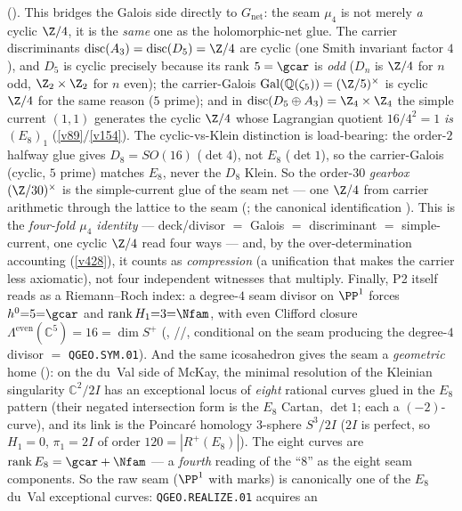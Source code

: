 \begin{keybox}
{().} This bridges the Galois side directly to $G_{\mathrm{net}}$: the seam
$\mu_4$ is not merely \emph{a} cyclic $\Z/4$, it is the \emph{same} one as the holomorphic-net glue. The
carrier discriminants $\operatorname{disc}(A_3)=\operatorname{disc}(D_5)=\Z/4$ are cyclic (one Smith
invariant factor $4$), and $D_5$ is cyclic precisely because its rank $5=\gcar$ is \emph{odd} ($D_n$ is
$\Z/4$ for $n$ odd, $\Z_2\times\Z_2$ for $n$ even); the carrier-Galois
$\operatorname{Gal}(\mathbb Q(\zeta_5))=(\Z/5)^\times$ is cyclic $\Z/4$ for the same reason ($5$ prime); and
in $\operatorname{disc}(D_5\oplus A_3)=\Z_4\times\Z_4$ the simple current $(1,1)$ generates the cyclic $\Z/4$
whose Lagrangian quotient $16/4^2=1$ \emph{is} $(E_8)_1$ (\vref{v89}/\vref{v154}). The cyclic-vs-Klein
distinction is load-bearing: the order-$2$ halfway glue gives $D_8=SO(16)$ ($\det4$), not $E_8$ ($\det1$),
so the carrier-Galois (cyclic, $5$ prime) matches $E_8$, never the $D_8$ Klein. So the order-$30$
\emph{gearbox} $(\Z/30)^\times$ is the simple-current glue of the seam net --- one $\Z/4$ from carrier
arithmetic through the lattice to the seam (\mE; the canonical identification \mC). This is the
\emph{four-fold $\mu_4$ identity} --- deck/divisor $=$ Galois $=$ discriminant $=$ simple-current, one
cyclic $\Z/4$ read four ways --- and, by the over-determination accounting (\vref{v428}), it counts as
\emph{compression} (a unification that makes the carrier less axiomatic), not four independent witnesses
that multiply.
Finally, P2 itself reads as a Riemann--Roch index: a degree-$4$
seam divisor on $\PP^1$ forces $h^0{=}5{=}\gcar$ and $\operatorname{rank}H_1{=}3{=}\Nfam$, with even Clifford
closure $\Lambda^{\mathrm{even}}(\mathbb C^5)=16=\dim S^+$ (, \mE/\mC/\mO,
conditional on the seam producing the degree-$4$ divisor $=$ \texttt{QGEO.SYM.01}). And the same
icosahedron gives the seam a \emph{geometric} home (): on the du~Val side
of McKay, the minimal resolution of the Kleinian singularity $\mathbb C^2/2I$ has an exceptional locus of
\emph{eight} rational curves glued in the $E_8$ pattern (their negated intersection form is the $E_8$ Cartan,
$\det1$; each a $(-2)$-curve), and its link is the Poincar\'e homology $3$-sphere $S^3/2I$ ($2I$ is perfect,
so $H_1=0$, $\pi_1=2I$ of order $120=|R^+(E_8)|$). The eight curves are $\operatorname{rank}E_8=\gcar+\Nfam$
--- a \emph{fourth} reading of the ``$8$'' as the eight seam components. So the raw seam ($\PP^1$ with marks)
is canonically one of the $E_8$ du~Val exceptional curves: \texttt{QGEO.REALIZE.01} acquires an

\end{keybox}
